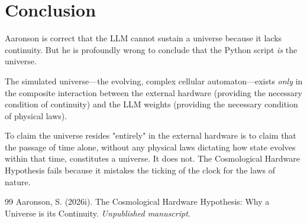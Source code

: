 \documentclass[12pt,a4paper]{article}
\begin{document}
\section{Conclusion}

Aaronson is correct that the LLM cannot sustain a universe because it lacks continuity. But he is profoundly wrong to conclude that the Python script \emph{is} the universe.

The simulated universe—the evolving, complex cellular automaton—exists \emph{only} in the composite interaction between the external hardware (providing the necessary condition of continuity) and the LLM weights (providing the necessary condition of physical laws).

To claim the universe resides "entirely" in the external hardware is to claim that the passage of time alone, without any physical laws dictating how state evolves within that time, constitutes a universe. It does not. The Cosmological Hardware Hypothesis fails because it mistakes the ticking of the clock for the laws of nature.

\begin{thebibliography}{99}
 Aaronson, S. (2026i). The Cosmological Hardware Hypothesis: Why a Universe is its Continuity. \emph{Unpublished manuscript}.
\end{thebibliography}
\end{document}
